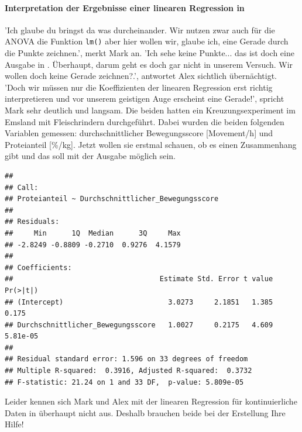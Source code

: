 \documentclass[a4paper, 9pt]{scrartcl}\usepackage[]{graphicx}\usepackage[]{xcolor}
\makeatletter
\newenvironment{kframe}{%
 \def\at@end@of@kframe{}%
 \ifinner\ifhmode%
  \def\at@end@of@kframe{\end{minipage}}%
  \begin{minipage}{\columnwidth}%
 \fi\fi%
 \def\FrameCommand##1{\hskip\@totalleftmargin \hskip-\fboxsep
 \colorbox{shadecolor}{##1}\hskip-\fboxsep
     \hskip-\linewidth \hskip-\@totalleftmargin \hskip\columnwidth}%
 \MakeFramed {\advance\hsize-\width
   \@totalleftmargin\z@ \linewidth\hsize
   \@setminipage}}%
 {\par\unskip\endMakeFramed%
 \at@end@of@kframe}
\newenvironment{knitrout}{}{} %
\makeatother
\begin{document}
\paragraph{Interpretation der Ergebnisse einer linearen Regression in \Rlogo}


'Ich glaube du bringst da was durcheinander. Wir nutzen zwar auch für die ANOVA die Funktion \texttt{lm()} aber hier wollen wir, glaube ich, eine Gerade durch die Punkte zeichnen.', merkt Mark an. 'Ich sehe keine Punkte... das ist doch eine Ausgabe in \Rlogo. Überhaupt, darum geht es doch gar nicht in unserem Versuch. Wir wollen doch keine Gerade zeichnen?.', antwortet Alex sichtlich übernächtigt. 'Doch wir müssen nur die Koeffizienten der linearen Regression erst richtig interpretieren und vor unserem geistigen Auge erscheint eine Gerade!', spricht Mark sehr deutlich und langsam. Die beiden hatten ein Kreuzungsexperiment im Emsland mit Fleischrindern durchgeführt. Dabei wurden die beiden folgenden Variablen gemessen: durchschnittlicher Bewegungsscore [Movement/h] und Proteianteil [\%/kg]. Jetzt wollen sie erstmal schauen, ob es einen Zusammenhang gibt und das soll mit der \Rlogo Ausgabe möglich sein.

\begin{knitrout}
\color{fgcolor}\begin{kframe}
\begin{verbatim}
## 
## Call:
## Proteianteil ~ Durchschnittlicher_Bewegungsscore
## 
## Residuals:
##     Min      1Q  Median      3Q     Max 
## -2.8249 -0.8809 -0.2710  0.9276  4.1579 
## 
## Coefficients:
##                                   Estimate Std. Error t value Pr(>|t|)
## (Intercept)                         3.0273     2.1851   1.385    0.175
## Durchschnittlicher_Bewegungsscore   1.0027     0.2175   4.609 5.81e-05
## 
## Residual standard error: 1.596 on 33 degrees of freedom
## Multiple R-squared:  0.3916,	Adjusted R-squared:  0.3732 
## F-statistic: 21.24 on 1 and 33 DF,  p-value: 5.809e-05
\end{verbatim}
\end{kframe}
\end{knitrout}

Leider kennen sich Mark und Alex mit der linearen Regression für kontinuierliche Daten in \Rlogo überhaupt nicht aus. Deshalb brauchen beide bei der Erstellung Ihre Hilfe!
\end{document}
